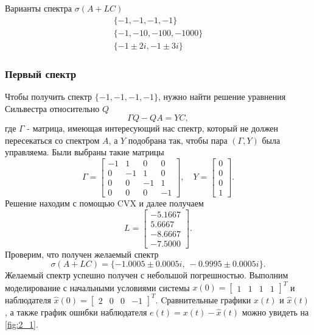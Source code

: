 Варианты спектра $\sigma(A+LC)$
\begin{equation*}
    \begin{array}{c}
        \{-1, -1, -1, -1\}\\
        \{-1, -10, -100, -1000\}\\
        \{-1 \pm 2i, -1 \pm 3i\}
    \end{array}
\end{equation*}


\subsubsection{Первый спектр}

Чтобы получить спектр $\{-1, -1, -1, -1\}$, нужно найти решение уравнения Сильвестра
относительно $Q$
\begin{equation*}
    \Gamma Q-QA=YC,
\end{equation*}
где $\Gamma$ - матрица, имеющая интересующий нас спектр, который не должен пересекаться
со спектром $A$, а $Y$ подобрана так, чтобы
пара $(\Gamma, Y)$ была управляема. Были выбраны такие матрицы
\begin{equation*}
    \Gamma=\begin{bmatrix}
        -1&  1&  0&  0\\
        0& -1&  1&  0\\
        0&  0& -1&  1\\
        0&  0&  0& -1
    \end{bmatrix},\quad
    Y=\begin{bmatrix}
        0\\ 0\\ 0\\ 1
    \end{bmatrix}.
\end{equation*}
Решение находим с помощью CVX и далее получаем
\begin{equation*}
    L=\begin{bmatrix}
        -5.1667\\
5.6667\\
-8.6667\\
-7.5000
    \end{bmatrix}.
\end{equation*}
Проверим, что получен желаемый спектр
\begin{equation*}
    \sigma(A+LC)=\{-1.0005\pm 0.0005i,\ -0.9995\pm 0.0005i\}.
\end{equation*}
Желаемый спектр успешно получен с небольшой погрешностью.
Выполним моделирование с начальными условиями системы 
$x(0) = \begin{bmatrix}
    1 & 1 & 1 & 1
\end{bmatrix}^T$ и наблюдателя $\hat x(0) = \begin{bmatrix}
    2 & 0 & 0 & -1
\end{bmatrix}^T$. Cравнительные графики $x(t)$ и $\hat x(t)$, 
а также график ошибки наблюдателя $e(t) = x(t) -\hat x(t)$
можно увидеть на \autoref{fig:2_1}.

